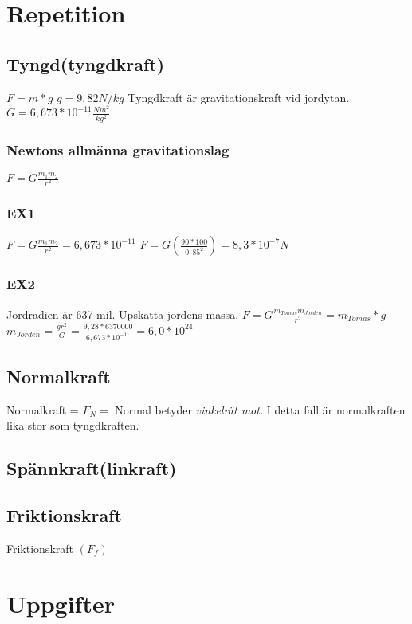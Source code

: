 \documentclass[a4paper,11pt]{article}
\begin{document}
\begin{flushleft}
\section{Repetition}
\subsection{Tyngd(tyngdkraft)}
$ F=m*g $\newline
$ g=9,82 N/kg $\newline
Tyngdkraft är gravitationskraft vid jordytan.\newline
$ G=6,673*10^{-11}\frac{Nm^2}{kg^2} $
\subsubsection{Newtons allmänna gravitationslag}
$ F=G\frac{m_1 m_2}{r^2} $
\subsubsection{EX1}
$ F=G\frac{m_1 m_2}{r^2}=6,673*10^{-11} $\newline
$ F=G(\frac{90*100}{0,85^2})=8,3*10^{-7}N $\newline
\subsubsection{EX2}
Jordradien är 637 mil. Upskatta jordens massa.\newline
$ F=G\frac{m_{Tomas} m_{Jorden}}{r^2}=m_{Tomas}*g $\newline
$ m_{Jorden}=\frac{gr^2}{G}=\frac{9,28*6370000}{6,673*10^{-11}}=6,0*10^{24} $
\subsection{Normalkraft}
Normalkraft = $F_N=$\newline
Normal betyder \textit{vinkelrät mot.}\newline
I detta fall är normalkraften lika stor som tyngdkraften.
\subsection{Spännkraft(linkraft)}
\subsection{Friktionskraft}
Friktionskraft $( F_f )$\newline
\newpage
\section{Uppgifter}

\end{flushleft}
\end{document}
